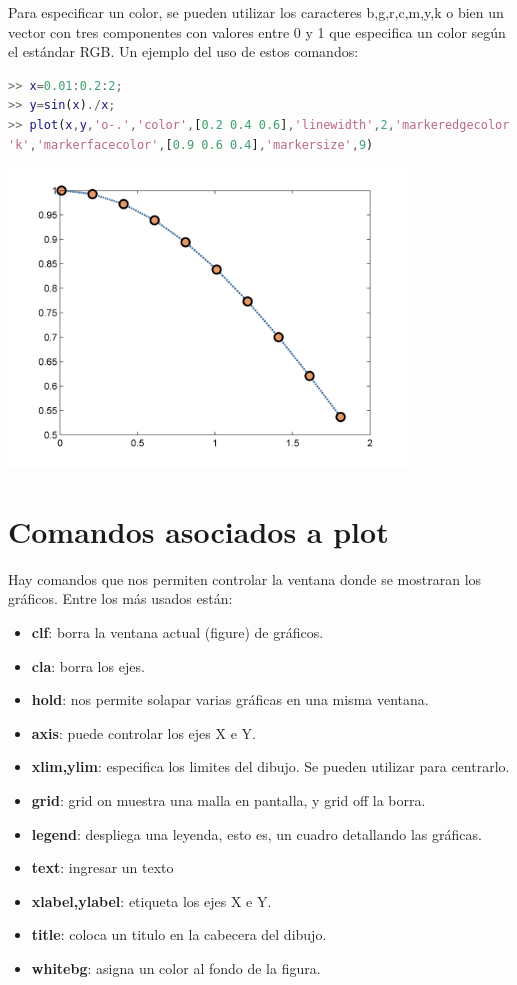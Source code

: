 Para especificar un color, se pueden utilizar los caracteres {b,g,r,c,m,y,k} o bien un vector con tres componentes con valores entre 0 y 1 que especifica un color según el estándar RGB. Un ejemplo del uso de estos comandos:

\begin{lstlisting}[language=Matlab]
>> x=0.01:0.2:2;
>> y=sin(x)./x;
>> plot(x,y,'o-.','color',[0.2 0.4 0.6],'linewidth',2,'markeredgecolor',...
'k','markerfacecolor',[0.9 0.6 0.4],'markersize',9)
\end{lstlisting}
\begin{center}
\includegraphics[width=300pt]{./Imagenes/tercernivel.png}
\end{center}

\section{Comandos asociados a plot}

Hay comandos que nos permiten controlar la ventana donde se mostraran los gráficos. Entre los más usados están:

\begin{itemize}
\item \textbf{clf}: borra la ventana actual (figure) de gráficos.
\item \textbf{cla}: borra los ejes.
\item \textbf{hold}: nos permite solapar varias gráficas en una misma ventana.
\item \textbf{axis}: puede controlar los ejes X e Y.
\item \textbf{xlim,ylim}: especifica los limites del dibujo. Se pueden utilizar para centrarlo.
\item \textbf{grid}: grid on muestra una malla en pantalla, y grid off la borra.
\item \textbf{legend}: despliega una leyenda, esto es, un cuadro detallando las gráficas.
\item \textbf{text}: ingresar un texto
\item \textbf{xlabel,ylabel}: etiqueta los ejes X e Y.
\item \textbf{title}: coloca un titulo en la cabecera del dibujo.
\item \textbf{whitebg}: asigna un color al fondo de la figura.
\end{itemize}

